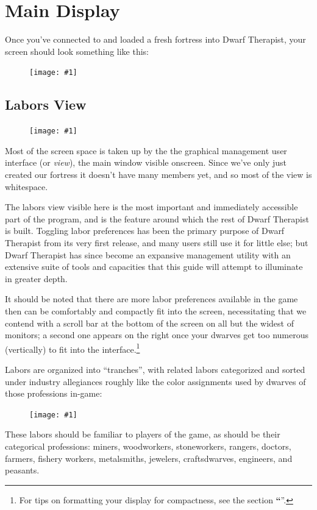 \documentclass[]{article}
\newcommand{\jump}[1] {\textbf{``\nameref{sec:#1}}''}
\newcommand{\fullfigure}[1] {
\begin{figure}[h!]
\texttt{[image: \#1]}
\end{figure}
}
\begin{document}
\section{Main Display}
\label{sec:Main Display}
Once you've connected to and loaded a fresh fortress into Dwarf Therapist, your screen should look
something like this:

\fullfigure{Sec1Fig4}

\subsection{Labors View}
\label{sec:Labors View}
\fullfigure{Sec1Fig5}

Most of the screen space is taken up by the the graphical management user interface
(or \emph{view}), the main window visible onscreen. Since we've only just created our fortress it doesn't
have many members yet, and so most of the view is whitespace.

The labors view visible here is the most important and immediately accessible part of the program,
and is the feature around which the rest of Dwarf Therapist is built. Toggling labor preferences has
been the primary purpose of Dwarf Therapist from its very first release, and many users still use it for
little else; but Dwarf Therapist has since become an expansive management utility with an
extensive suite of tools and capacities that this guide will attempt to illuminate in greater depth.

It should be noted that there are more labor preferences available in the game
then can be comfortably and compactly fit into the screen, necessitating that we contend with a scroll
bar at the bottom of the screen on all but the widest of monitors; a second one appears on the right once
your dwarves get too numerous (vertically) to fit into the interface.\footnote{For tips on
formatting your display for compactness, see the section \jump{Formatting Your Display}.}

Labors are organized into ``tranches'', with related labors categorized and sorted under industry
allegiances roughly like the color assignments used by dwarves of those professions in-game:
\fullfigure{Sec1Fig6+}

These labors should be familiar to players of the game, as should be their categorical
professions: miners, woodworkers, stoneworkers, rangers, doctors, farmers, fishery workers, metalsmiths,
jewelers, craftsdwarves, engineers, and peasants.
\end{document}
